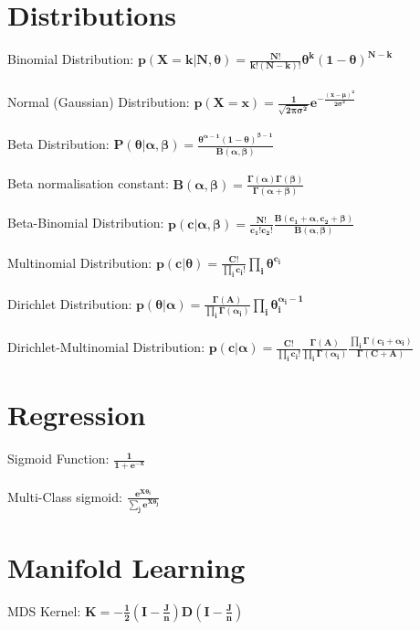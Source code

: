 \documentclass{article}
\begin{document}
\section{Distributions}
Binomial Distribution: $\mathbf{p(X = k|N,\theta) = \frac{N!}{k!(N-k)!}\theta^k(1-\theta)^{N-k}}$\\\\
Normal (Gaussian) Distribution: $\mathbf{p(X = x) = \frac{1}{\sqrt{2\pi \sigma ^2}} e^{-\frac{(x-\mu )^2}{2\sigma ^2}}}$\\\\
Beta Distribution: $\mathbf{P(\theta |\alpha ,\beta ) = \frac{\theta^{\alpha - 1}(1-\theta )^{\beta - 1}}{B(\alpha , \beta)}}$\\\\
Beta normalisation constant: $\mathbf{B(\alpha,\beta) = \frac{\Gamma(\alpha)\Gamma(\beta)}{\Gamma(\alpha+\beta)}}$\\\\
Beta-Binomial Distribution: $\mathbf{p(c|\alpha,\beta) = \frac{N!}{c_1!c_2!}\frac{B(c_1 + \alpha, c_2 + \beta)}{B(\alpha,\beta)}}$\\\\
Multinomial Distribution: $\mathbf{p(c|\theta) = \frac{C!}{\prod_{i}^{}c_i!}\prod_{i}^{}\theta^{c_i}}$\\\\
Dirichlet Distribution: $\mathbf{p(\theta|\alpha) = \frac{\Gamma(A)}{\prod_{i}^{}\Gamma(\alpha_i)}\prod_{i}^{}\theta_i^{\alpha_i-1}}$\\\\
Dirichlet-Multinomial Distribution: $\mathbf{p(c|\alpha) = \frac{C!}{\prod_{i}^{}c_i!}\frac{\Gamma(A)}{\prod_{i}^{}\Gamma(\alpha_i)}\frac{\prod_{i}^{}\Gamma(c_i+\alpha_i)}{\Gamma(C+A)}}$
\section{Regression}
Sigmoid Function: $\mathbf{\frac{1}{1+e^{-x}}}$\\\\
Multi-Class sigmoid: $\mathbf{\frac{e^{X\theta_i}}{\sum_{j}^{}e^{X\theta_j}}}$
\section{Manifold Learning}
MDS Kernel: $\mathbf{K=-\frac{1}{2}(I-\frac{J}{n})D(I-\frac{J}{n})}$
\end{document}
